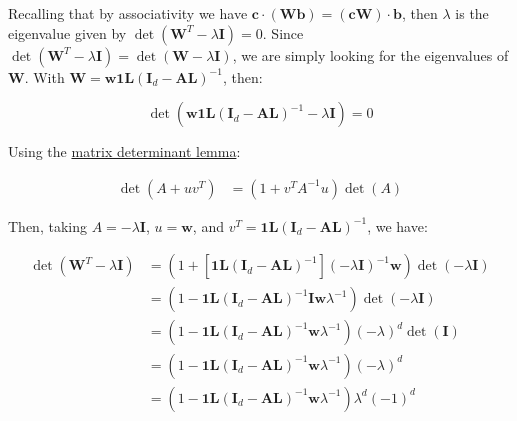 Recalling that by associativity we have $\boldsymbol{c} \cdot (\boldsymbol{Wb}) = (\boldsymbol{cW}) \cdot \boldsymbol{b}$, then $\lambda$ is the eigenvalue given by $\det\left(\boldsymbol{W}^{T}-\lambda\boldsymbol{I}\right)=0$. Since $\det\left(\boldsymbol{W}^{T}-\lambda\boldsymbol{I}\right) = \det\left(\boldsymbol{W}-\lambda\boldsymbol{I}\right)$, we are simply looking for the eigenvalues of $\boldsymbol{W}$. With $\boldsymbol{W} = \boldsymbol{w} \boldsymbol{1} \boldsymbol{L} \left(\boldsymbol{I}_{d}-\boldsymbol{A}\boldsymbol{L}\right)^{-1}$, then:

\begin{equation}
\det\left(\boldsymbol{w}\boldsymbol{1}\boldsymbol{L}\left(\boldsymbol{I}_{d}-\boldsymbol{A}\boldsymbol{L}\right)^{-1}-\lambda\boldsymbol{I}\right)=0
\end{equation}

Using the \href{https://en.wikipedia.org/wiki/Matrix_determinant_lemma}{matrix determinant lemma}: 

\begin{align}
\det\left(A+uv^{T}\right) & =\left(1+v^{T}A^{-1}u\right)\det\left(A\right)
\end{align}

Then, taking $A=-\lambda\boldsymbol{I}$, $u=\boldsymbol{w}$, and $v^{T}=\boldsymbol{1}\boldsymbol{L}\left(\boldsymbol{I}_{d}-\boldsymbol{A}\boldsymbol{L}\right)^{-1}$, we have:


\begin{align}
\det\left(\boldsymbol{W}^{T}-\lambda\boldsymbol{I}\right) & =\left(1+\left[\boldsymbol{1}\boldsymbol{L}\left(\boldsymbol{I}_{d}-\boldsymbol{A}\boldsymbol{L}\right)^{-1}\right]\left(-\lambda\boldsymbol{I}\right)^{-1}\boldsymbol{w}\right)\det\left(-\lambda\boldsymbol{I}\right)\\
 & =\left(1-\boldsymbol{1}\boldsymbol{L}\left(\boldsymbol{I}_{d}-\boldsymbol{A}\boldsymbol{L}\right)^{-1}\boldsymbol{I}\boldsymbol{w}\lambda^{-1}\right)\det\left(-\lambda\boldsymbol{I}\right)\\
 & =\left(1-\boldsymbol{1}\boldsymbol{L}\left(\boldsymbol{I}_{d}-\boldsymbol{A}\boldsymbol{L}\right)^{-1}\boldsymbol{w}\lambda^{-1}\right)\left(-\lambda\right)^{d}\det\left(\boldsymbol{I}\right)\\
 & =\left(1-\boldsymbol{1}\boldsymbol{L}\left(\boldsymbol{I}_{d}-\boldsymbol{A}\boldsymbol{L}\right)^{-1}\boldsymbol{w}\lambda^{-1}\right)\left(-\lambda\right)^{d}\\
 & =\left(1-\boldsymbol{1}\boldsymbol{L}\left(\boldsymbol{I}_{d}-\boldsymbol{A}\boldsymbol{L}\right)^{-1}\boldsymbol{w}\lambda^{-1}\right)\lambda^{d}\left(-1\right)^{d}
\end{align}

